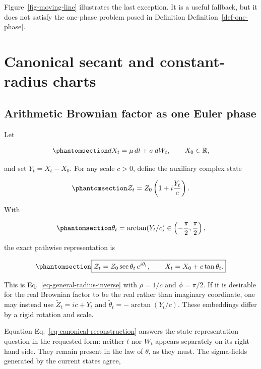 \documentclass[
  english,
  10pt,
  letterpaper,
  DIV=11,
  numbers=noendperiod]{scrartcl}
\theoremstyle{definition}
\theoremstyle{plain}
\theoremstyle{plain}
\theoremstyle{remark}
\begin{document}
Figure~\ref{fig-moving-line} illustrates the last exception. It is a
useful fallback, but it does not satisfy the one-phase problem posed in
Definition Definition~\ref{def-one-phase}.

\section{Canonical secant and constant-radius
charts}\label{sec-canonical}

\subsection{Arithmetic Brownian factor as one Euler
phase}\label{arithmetic-brownian-factor-as-one-euler-phase}

Let

\begin{equation}\protect\phantomsection\label{eq-arithmetic-brownian}{
dX_t=\mu\,dt+\sigma\,dW_t,\qquad X_0\in\mathbb R,
}\end{equation}

and set \(Y_t=X_t-X_0\). For any scale \(c>0\), define the auxiliary
complex state

\begin{equation}\protect\phantomsection\label{eq-canonical-embedding}{
\mathcal Z_t
=Z_0\left(1+i\frac{Y_t}{c}\right).
}\end{equation}

With

\begin{equation}\protect\phantomsection\label{eq-canonical-phase}{
\theta_t=\arctan(Y_t/c)
\in\left(-\frac\pi2,\frac\pi2\right),
}\end{equation}

the exact pathwise representation is

\begin{equation}\protect\phantomsection\label{eq-canonical-reconstruction}{
\boxed{
\mathcal Z_t=Z_0\sec\theta_t\,e^{i\theta_t},
\qquad
X_t=X_0+c\tan\theta_t.
}
}\end{equation}

This is Eq.~\ref{eq-general-radius-inverse} with \(\rho=1/c\) and
\(\phi=\pi/2\). If it is desirable for the real Brownian factor to be
the real rather than imaginary coordinate, one may instead use
\(\widetilde Z_t=ic+Y_t\) and \(\widetilde\theta_t=-\arctan(Y_t/c)\).
These embeddings differ by a rigid rotation and scale.

Equation Eq.~\ref{eq-canonical-reconstruction} answers the
state-representation question in the requested form: neither \(t\) nor
\(W_t\) appears separately on its right-hand side. They remain present
in the law of \(\theta\), as they must. The sigma-fields generated by
the current states agree,
\end{document}
